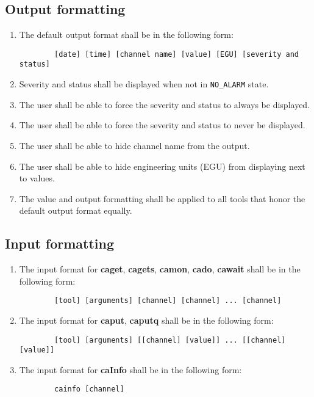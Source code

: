 \documentclass[12pt,a4paper]{article}
\begin{document}
\subsection{Output formatting}
\begin{enumerate}
	\item The default output format shall be in the following form: 
	\begin{verbatim}
		[date] [time] [channel name] [value] [EGU] [severity and status]
	\end{verbatim}
	\item Severity and status shall be displayed when not in \texttt{NO\_ALARM} state.
	\item The user shall be able to force the severity and status to always be displayed.
	\item The user shall be able to force the severity and status to never be displayed.
	\item The user shall be able to hide channel name from the output.
	\item The user shall be able to hide engineering units (EGU) from displaying next to values.
	\item The value and output formatting shall be applied to all tools that honor the default output format equally.
\end{enumerate}

\subsection{Input formatting}
\begin{enumerate}
	\item The input format for \textbf{caget}, \textbf{cagets}, \textbf{camon}, \textbf{cado}, \textbf{cawait} shall be in the following form:
	\begin{verbatim}
		[tool] [arguments] [channel] [channel] ... [channel]
	\end{verbatim}	
	\item The input format for \textbf{caput}, \textbf{caputq} shall be in the following form:
	\begin{verbatim}
		[tool] [arguments] [[channel] [value]] ... [[channel] [value]]
	\end{verbatim}
	\item The input format for \textbf{caInfo} shall be in the following form:
	\begin{verbatim}
		cainfo [channel]
	\end{verbatim}
\end{enumerate}



\end{document}
